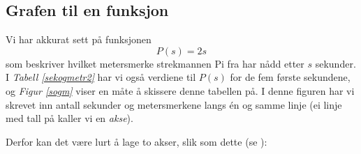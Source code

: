 \subsection{Grafen til en funksjon}
Vi har akkurat sett på funksjonen
\[ P(s)=2s \]
som beskriver hvilket metersmerke strekmannen Pi fra  har nådd etter $ s $ sekunder. I \textsl{Tabell \ref{sekogmetr2}} har vi også verdiene til $ P(s) $ for de fem første sekundene, og \textsl{Figur \ref{sogm}} viser en måte å skissere denne tabellen på. I denne figuren har vi skrevet inn antall sekunder og metersmerkene langs én og samme linje (ei linje med tall på kaller vi en \textit{akse}). \vsk

\qquad {}\vspace{-2pt}
Derfor kan det være lurt å lage to akser, slik som dette (se ):

